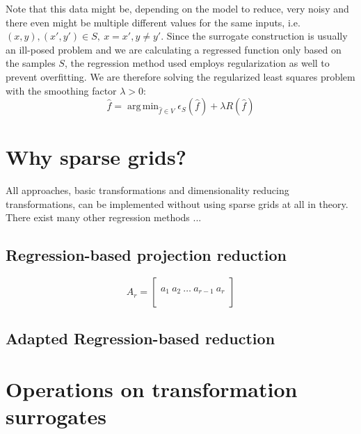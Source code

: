 \documentclass[
  a4paper,  %
  twoside,  %
  bibliography=totoc,
  headsepline,
  cleardoublepage=empty,
  parskip=half,
  draft=false
]{scrbook}
\DeclareMathOperator*{\argmin}{arg\,min}
\begin{document}
Note that this data might be, depending on the model to reduce, very noisy and there even might be multiple different values for the same inputs, i.e. $(x,y), (x',y') \in S, ~ x=x', y\neq y'$.
Since the surrogate construction is usually an ill-posed problem and we are calculating a regressed function only based on the samples $S$, the regression method used employs regularization as well to prevent overfitting.
We are therefore solving the regularized least squares problem with the smoothing factor $\lambda > 0$:
\begin{equation}
\hat{f} = \argmin_{\hat{f} \in V} \epsilon_{S}(\hat{f}) + \lambda R(\hat{f})
\end{equation}


\section{Why sparse grids?}

All approaches, basic transformations and dimensionality reducing transformations, can be implemented without using sparse grids at all in theory.
There exist many other regression methods ...



\subsection{Regression-based projection reduction}

\begin{equation}
A_r=\begin{bmatrix}
  \\
    a_1 ~ a_2 ~ \dots ~ a_{r-1} ~ a_r\\
    \\
  \end{bmatrix}
\label{basis}
\end{equation}


\subsection{Adapted Regression-based reduction}

\section{Operations on transformation surrogates}
\end{document}
